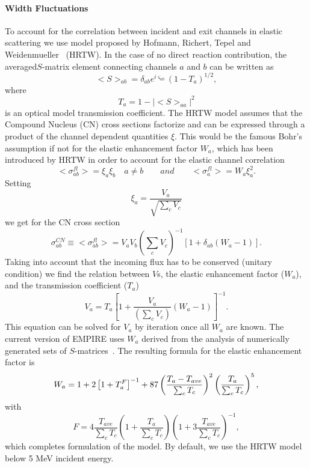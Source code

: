 \paragraph{Width Fluctuations}

To account for the correlation between incident and exit channels in elastic
scattering we use model proposed by Hofmann, Richert, Tepel and
Weidenmueller~\cite{HRTW} (HRTW). In the case of no direct reaction
contribution, the averaged$S$-matrix element connecting channels $a$ and $b$
can be written as
\begin{equation}
<S>_{ab}=\delta_{ab}e^{i\varsigma_{ab}}(1-T_{a})^{1/2},  \label{Sab}
\end{equation}
\noindent where
\begin{equation}
T_{a}=1-|<S>_{aa}|^{2}  \label{Ta}
\end{equation}
is an optical model transmission coefficient. The HRTW model assumes that
the Compound Nucleus (CN) cross sections factorize and can be expressed
through a product of the channel dependent quantities $\xi$. This would be
the famous Bohr's assumption if not for the elastic enhancement factor $%
W_{a} $, which has been introduced by HRTW in order to account for the
elastic channel correlation
\begin{equation}
<\sigma_{ab}^{fl}>=\xi_{a}\xi_{b}\quad a\neq b\qquad
and\qquad<\sigma_{a}^{fl}>=W_{a}\xi_{a}^{2}.  \label{Sig-fluc}
\end{equation}
Setting
\begin{equation}
\xi_{a}=%
\frac{V_{a}}{\sqrt{\sum_{c}V_{c}}}  \label{ksi}
\end{equation}
we get for the CN cross section
\begin{equation}
\sigma_{ab}^{CN}\equiv<\sigma_{ab}^{fl}>=V_{a}V_{b}\left(\sum_{c}V_{c}%
\right)^{-1}\left[1+\delta_{ab}\left(W_{a}-1\right)\right].
\label{Sig-flucV}
\end{equation}
Taking into account that the incoming flux has to be conserved (unitary
condition) we find the relation between $V$s, the elastic enhancement factor
($W_{a}$), and the transmission coefficient ($T_{a}$)
\begin{equation}
V_{a}=T_{a}\left[1+\frac{V_{a}}{\left(\sum_{c}V_{c}\right)}%
\left(W_{a}-1\right)\right]^{-1}.  \label{Va}
\end{equation}
This equation can be solved for $V_{a}$ by iteration once all $W_{a}$ are
known. The current version of EMPIRE uses $W_{a}$ derived from the analysis
of numerically generated sets of $S$-matrices~\cite{HHM}. The resulting
formula for the elastic enhancement factor is
\begin{equation}
W_{a}=1+2\left[1+T_{a}^{F}\right]^{-1}+87\left(\frac{T_{a}-T_{ave}}{%
\sum_{c}T_{c}}\right)^{2}\left(\frac{T_{a}}{\sum_{c}T_{c}}\right)^{5},
\label{Wa}
\end{equation}
with
\begin{equation}
F=4\frac{T_{ave}}{\sum_{c}T_{c}}\left(1+\frac{T_{a}}{\sum_{c}T_{c}}%
\right)\left(1+3\frac{T_{ave}}{\sum_{c}T_{c}}\right)^{-1},  \label{Wa-F}
\end{equation}
which completes formulation of the model. By default, we use the HRTW model
below 5 MeV incident energy.

